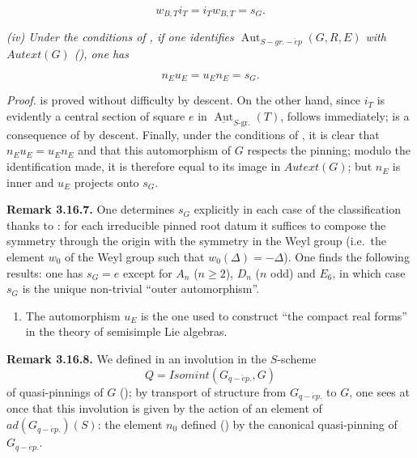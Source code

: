 \[
  w_{B,T}i_T=i_Tw_{B,T}=s_G.
\]

\emph{(iv) Under the conditions of , if one identifies \(\operatorname{Aut}_{S-gr.-\acute{e}p}(G, R, E)\) with
\(Autext(G)\) (), one has}

\[
  n_Eu_E=u_En_E=s_G.
\]

\emph{Proof.}  is proved without difficulty by descent. On the other hand, since \(i_{T}\) is evidently a central section of
square \(e\) in \(\underline{\operatorname{Aut}}_{S\text{-}\mathrm{gr.}}(T)\),  follows immediately;  is a consequence of  by descent.
Finally, under the conditions of , it is clear that \(n_{E} u_{E} = u_{E} n_{E}\) and that this automorphism of \(G\)
respects the pinning; modulo the identification made, it is therefore equal to its image in \(Autext(G)\); but \(n_{E}\) is
inner and \(u_{E}\) projects onto \(s_{G}\).

\textbf{Remark 3.16.7.}  One determines \(s_{G}\) explicitly in each case of the classification thanks to : for each
irreducible pinned root datum it suffices to compose the symmetry through the origin with the symmetry in the Weyl group
(i.e.~the element \(w_{0}\) of the Weyl group such that \(w_{0}(\Delta) = -\Delta\)). One finds the following results: one
has \(s_{G} = e\) except for \(A_{n}\) (\(n \geqslant 2\)), \(D_{n}\) (\(n\) odd) and \(E_6\), in which case \(s_{G}\) is the unique
non-trivial ``outer automorphism''.

\begin{enumerate}
\def\labelenumi{(\roman{enumi})}
\setcounter{enumi}{1}
\item
  The automorphism \(u_{E}\) is the one used to construct ``the compact real forms'' in the theory of semisimple Lie
  algebras.
\end{enumerate}

\textbf{Remark 3.16.8.} We defined in  an involution in the \(S\)-scheme
\[
Q = Isomint(G_{q-\acute{e}p.}, G)
\]
of quasi-pinnings of \(G\) (); by transport of structure from \(G_{q-\acute{e}p.}\) to \(G\), one sees at once that
this involution is given by the action of an element of \(ad(G_{q-\acute{e}p.})(S)\): the element \(n_{0}\) defined () by the canonical quasi-pinning of \(G_{q-\acute{e}p.}\).

